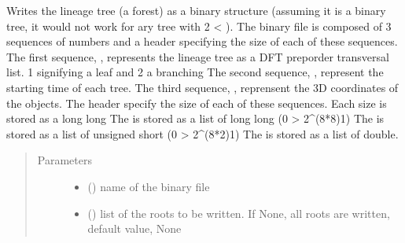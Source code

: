 \documentclass[letterpaper,10pt,english]{sphinxmanual}
\begin{document}
\begin{fulllineitems}
\begin{fulllineitems}
\label{\detokenize{index:LineageTree.lineageTree.to_binary}}
Writes the lineage tree (a forest) as a binary structure
(assuming it is a binary tree, it would not work for  ary tree with 2 \textless{} ).
The binary file is composed of 3 sequences of numbers and
a header specifying the size of each of these sequences.
The first sequence, , represents the lineage tree
as a DFT preporder transversal list. \sphinxhyphen{}1 signifying a leaf and \sphinxhyphen{}2 a branching
The second sequence, , represent the starting time of each tree.
The third sequence, , reprensent the 3D coordinates of the objects.
The header specify the size of each of these sequences.
Each size is stored as a long long
The  is stored as a list of long long (0 \sphinxhyphen{}\textgreater{} 2\textasciicircum{}(8*8)\sphinxhyphen{}1)
The  is stored as a list of unsigned short (0 \sphinxhyphen{}\textgreater{} 2\textasciicircum{}(8*2)\sphinxhyphen{}1)
The  is stored as a list of double.
\begin{quote}\begin{description}
\item[{Parameters}] \leavevmode\begin{itemize}
\item {} 
 () \textendash{} name of the binary file

\item {} 
 (\sphinxstyleliteralemphasis{\sphinxupquote{{[}}}\sphinxstyleliteralemphasis{\sphinxupquote{, }}\sphinxstyleliteralemphasis{\sphinxupquote{{]}}}) \textendash{} list of the roots to be written.
If None, all roots are written, default value, None

\end{itemize}

\end{description}\end{quote}

\end{fulllineitems}


\end{fulllineitems}
\end{document}
